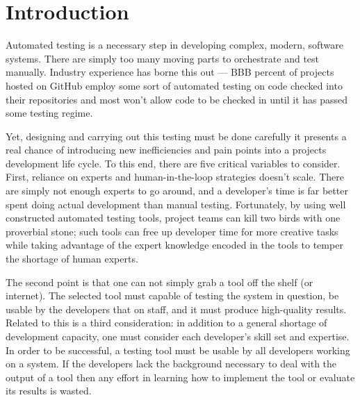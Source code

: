 \section{Introduction}
\label{SEC:introduction}


 Automated testing
is a necessary step in developing complex, modern, software systems.  There
are simply too many moving parts to orchestrate and test manually.
Industry experience has borne this out --- BBB percent of projects hosted
on GitHub employ some sort of automated testing on code checked into their
repositories and most won't allow code to be checked in until it has passed
some testing regime.

Yet, designing and carrying out this testing must be done carefully it
presents a real chance of introducing new inefficiencies and pain points
into a projects development life cycle.  To this end, there are five
critical variables to consider.  First, reliance on experts and
human-in-the-loop strategies doesn't scale.  There are
simply not enough experts to go around, and a developer's time is far
better spent doing actual development than manual testing.  Fortunately, by using well constructed automated
testing tools, project teams can kill two birds with one proverbial stone;
such tools can free up developer time for more creative tasks while taking
advantage of the expert knowledge encoded in the tools to temper the
shortage of human experts.


The second point is that one can not simply grab a tool off the shelf (or
internet).  The selected tool must capable of testing the system in
question, be usable by the developers that on staff, and it must produce
high-quality results.  Related to this is a third consideration: in
addition to a general shortage of development capacity, one must consider
each developer’s skill set and expertise. In order to be successful, a
testing tool must be usable by all developers working on a system. If the
developers lack the background necessary to deal with the output of a tool
then any effort in learning how to implement the tool or  evaluate its
results is wasted.

